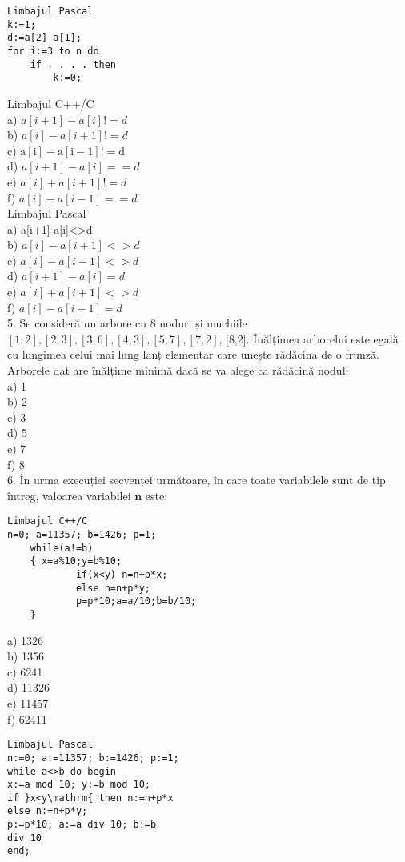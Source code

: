 \begin{verbatim}
Limbajul Pascal
k:=1;
d:=a[2]-a[1];
for i:=3 to n do
    if . . . . then
        k:=0;
\end{verbatim}

Limbajul C++/C\\
a) $a[i+1]-a[i]!=d$\\
b) $a[i]-a[i+1]!=d$\\
c) $\mathrm{a}[\mathrm{i}]-\mathrm{a}[\mathrm{i}-1]!=\mathrm{d}$\\
d) $a[i+1]-a[i]==d$\\
e) $a[i]+a[i+1]!=d$\\
f) $a[i]-a[i-1]==d$\\
Limbajul Pascal\\[0pt]
a) a[i+1]-a[i]<>d\\
b) $a[i]-a[i+1]<>d$\\
c) $a[i]-a[i-1]<>d$\\
d) $a[i+1]-a[i]=d$\\
e) $a[i]+a[i+1]<>d$\\
f) $a[i]-a[i-1]=d$\\
5. Se consideră un arbore cu 8 noduri și muchiile $[1,2],[2,3],[3,6],[4,3],[5,7],[7,2]$, [8,2]. Înălțimea arborelui este egală cu lungimea celui mai lung lanț elementar care unește rădăcina de o frunză. Arborele dat are înălțime minimă dacă se va alege ca rădăcină nodul:\\
a) 1\\
b) 2\\
c) 3\\
d) 5\\
e) 7\\
f) 8\\
6. În urma execuției secvenței următoare, în care toate variabilele sunt de tip întreg, valoarea variabilei $\boldsymbol{n}$ este:

\begin{verbatim}
Limbajul C++/C
n=0; a=11357; b=1426; p=1;
    while(a!=b)
    { x=a%10;y=b%10;
            if(x<y) n=n+p*x;
            else n=n+p*y;
            p=p*10;a=a/10;b=b/10;
    }
\end{verbatim}

a) 1326\\
b) 1356\\
c) 6241\\
d) 11326\\
e) 11457\\
f) 62411

\begin{verbatim}
Limbajul Pascal
n:=0; a:=11357; b:=1426; p:=1;
while a<>b do begin
x:=a mod 10; y:=b mod 10;
if }x<y\mathrm{ then n:=n+p*x
else n:=n+p*y;
p:=p*10; a:=a div 10; b:=b
div 10
end;
\end{verbatim}

